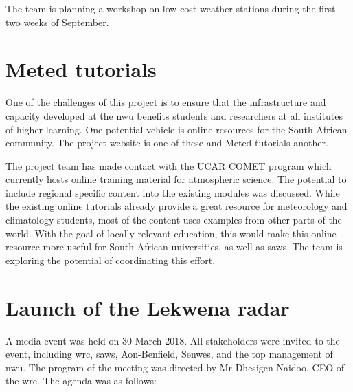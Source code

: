 \documentclass{wrcreport}
\begin{document}
The team is planning a workshop on low-cost weather stations during the first two weeks of September. 

\section{Meted tutorials}

One of the challenges of this project is to ensure that the infrastructure and capacity developed at the \gls{nwu} benefits students and researchers at all institutes of higher learning. One potential vehicle is online resources for the South African community. The project website is one of these and Meted tutorials another.

The project team has made contact with the UCAR COMET program which currently hosts online training material for atmospheric science. The potential to include regional specific content into the existing modules was discussed. While the existing online tutorials already provide a great resource for meteorology and climatology students, most of the content uses examples from other parts of the world. With the goal of locally relevant education, this would make this online resource more useful for South African universities, as well as \gls{saws}. The team is exploring the potential of coordinating this effort.

\section{Launch of the Lekwena radar}

A media event was held on 30 March 2018. All stakeholders were invited to the event, including \gls{wrc}, \gls{saws}, Aon-Benfield, Senwes, and the top management of \gls{nwu}. The program of the meeting was directed by Mr Dhesigen Naidoo, CEO of the \gls{wrc}. The agenda was as follows:
\end{document}
